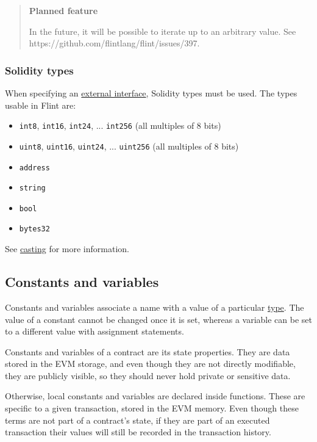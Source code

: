 \begin{quote}
\textbf{Planned feature}

In the future, it will be possible to iterate up to an arbitrary value. See https://github.com/flintlang/flint/issues/397.
\end{quote}

\subsubsection{Solidity types}
\label{sec:appendix-b-solidity-types}

When specifying an \hyperref[sec:appendix-b-external-calls]{external interface}, Solidity types must be used. The types usable in Flint are:

\begin{itemize}
	\item \texttt{int8}, \texttt{int16}, \texttt{int24}, ... \texttt{int256} (all multiples of 8 bits)
	\item \texttt{uint8}, \texttt{uint16}, \texttt{uint24}, ... \texttt{uint256} (all multiples of 8 bits)
	\item \texttt{address}
	\item \texttt{string}
	\item \texttt{bool}
	\item \texttt{bytes32}
\end{itemize}

See \hyperref[sec:appendix-b-casting-to-and-from-solidity-types]{casting} for more information.

\subsection{Constants and variables}
\label{sec:appendix-b-constants-and-variables}

Constants and variables associate a name with a value of a particular \hyperref[sec:appendix-b-types]{type}. The value of a constant cannot be changed once it is set, whereas a variable can be set to a different value with assignment statements.

Constants and variables of a contract are its state properties. They are data stored in the EVM storage, and even though they are not directly modifiable, they are publicly visible, so they should never hold private or sensitive data.

Otherwise, local constants and variables are declared inside functions. These are specific to a given transaction, stored in the EVM memory. Even though these terms are not part of a contract's state, if they are part of an executed transaction their values will still be recorded in the transaction history.

